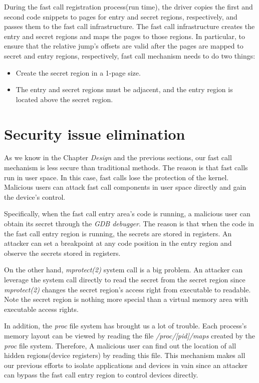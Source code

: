 During the fast call registration process(run time), 
the driver copies the first and second code snippets to pages for entry and secret 
regions, respectively, and passes them to the fast call infrastructure. 
The fast call infrastructure creates the entry and secret regions and maps the 
pages to those regions.  In particular, to ensure that the relative jump's offsets are valid after the pages are mapped to secret and entry regions, 
respectively, fast call mechanism needs to do two things:


\begin{itemize}
  \item Create the secret region in a 1-page size.
  \item The entry and secret regions must be adjacent, and the entry region is located above the secret region.
\end{itemize}


\section{Security issue elimination}

As we know in the Chapter \emph{Design} and the previous sections, our fast call 
mechanism is less secure than traditional methods. The reason is that fast 
calls run in user space. In this case, fast calls lose the protection of the kernel. 
Malicious users can attack fast call components in user space directly and gain the device's control.


Specifically, when the fast call entry area's code is running, a malicious 
user can obtain its secret through the \emph{GDB debugger}\cite{16}. The reason is that when 
the code in the fast call entry region is running, the secrets are stored in 
registers. An attacker can set a breakpoint at any code position in the entry
 region and observe the secrets stored in registers.

On the other hand, \emph{mprotect(2)} system call\cite{19} is a big problem. An attacker 
can leverage the system call directly to read the secret from the secret 
region since \emph{mprotect(2)} changes the secret region's access right from 
executable to readable.  Note the secret region is nothing more special 
than a virtual memory area with executable access rights. 

In addition, the \emph{proc} file system has brought us a lot of trouble. 
Each process's memory layout can be viewed by reading the file \emph{/proc/[pid]/maps} 
created by the \emph{proc} file system. Therefore,  A malicious user can find out the 
location of all hidden regions(device registers) by reading this file. This 
mechanism makes all our previous efforts to isolate applications and devices 
in vain since an attacker can bypass the fast call entry region to control 
devices directly.  

